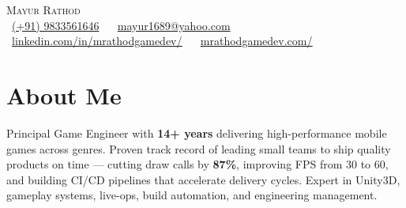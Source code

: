 \documentclass[letterpaper,11pt]{article}
\begin{document}
\begin{center}
    {\Large \scshape Mayur Rathod} \\[2mm]
    \footnotesize \raisebox{-0.1\height}
    \faPhone\ \underline{(+91) 9833561646} ~ 
    {\faEnvelope\  \underline{mayur1689@yahoo.com}} ~ 
    {\faLinkedin\ \underline{\href{https://www.linkedin.com/in/mrathodgamedev/}{linkedin.com/in/mrathodgamedev/}}}  ~
    {\faBriefcase\ \underline{\href{https://mrathodgamedev.com/}{mrathodgamedev.com/}}}
    \vspace{-8pt}
\end{center}

\vspace{5pt}

\section{About Me} 
    \vspace{2pt}
        \noindent Principal Game Engineer with \textbf{14+ years} delivering high-performance mobile games across genres. Proven track record of leading small teams to ship quality products on time --- cutting draw calls by \textbf{87\%}, improving FPS from 30 to 60, and building CI/CD pipelines that accelerate delivery cycles. Expert in Unity3D, gameplay systems, live-ops, build automation, and engineering management.

\end{document}
